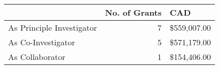 \begin{tabular}{lrl}
\toprule
 & No. of Grants & CAD \\
\midrule
As Principle Investigator & 7 & \$559,007.00 \\
As Co-Investigator & 5 & \$571,179.00 \\
As Collaborator & 1 & \$154,406.00 \\
\bottomrule
\end{tabular}
